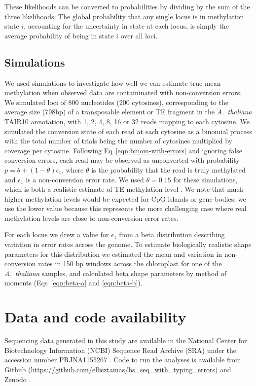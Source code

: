 \documentclass[10pt,letterpaper,draft]{article}
\begin{document}
These likelihoods can be converted to probabilities by dividing by the sum of the three likelihoods.
The global probability that any single locus is in methylation state $i$, accounting for the uncertainty in state at each locus, is simply the average probability of being in state $i$ over all loci.

\subsection*{Simulations}

We used simulations to investigate how well we can estimate true mean methylation when observed data are contaminated with non-conversion errors.
We simulated loci of 800 nucleotides (200 cytosines), corresponding to the average size (798bp) of a transposable element or TE fragment in the \textit{A.~thaliana} TAIR10 annotation, with 1, 2, 4, 8, 16 or 32 reads mapping to each cytosine.
We simulated the conversion state of each read at each cytosine as a binomial process with the total number of trials being the number of cytosines multiplied by coverage per cytosine.
Following Eq~\ref{eqn:binom-with-errors} and ignoring false conversion errors, each read may be observed as unconverted with probability $p=\theta + (1-\theta)\epsilon_1$, where $\theta$ is the probability that the read is truly methylated and $\epsilon_1$ is a non-conversion error rate.
We used $\theta=0.15$ for these simulations, which is both a realistic estimate of TE methylation level \cite{dubin2015dna}.
We note that much higher methylation levels would be expected for CpG islands or gene-bodies; we use the lower value because this represents the more challenging case where real methylation levels are close to non-conversion error rates.

For each locus we drew a value for $\epsilon_1$ from a beta distribution describing variation in error rates across the genome.
To estimate biologically realistic shape parameters for this distribution we estimated the mean and variation in non-conversion rates in 150 bp windows across the chloroplast for one of the \emph{A.~thaliana} samples, and calculated beta shape parameters by method of moments (Eqs~\ref{eqn:beta-a} and \ref{eqn:beta-b}).

\section*{Data and code availability}

Sequencing data generated in this study are available in the National Center for Biotechnology Information (NCBI) Sequence Read Archive (SRA) under the accession number PRJNA1155267 \cite{ellis2023datafrom}.
Code to run the analyses is available from Github (\url{https://github.com/ellisztamas/bs_seq_with_typing_errors}) and Zenodo \cite{ellis2023codefrom}.
\end{document}
